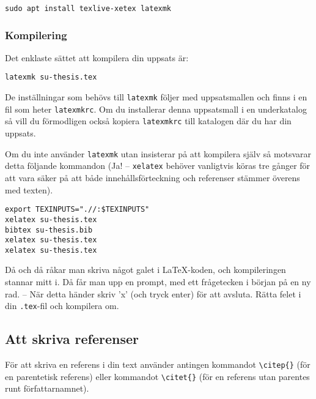\begin{verbatim}
sudo apt install texlive-xetex latexmk
\end{verbatim}



\subsubsection{Kompilering}

Det enklaste sättet att kompilera din uppsats är:

\begin{verbatim}
latexmk su-thesis.tex
\end{verbatim}

De inställningar som behövs till \texttt{latexmk} följer med uppsatsmallen och
finns i en fil som heter \texttt{latexmkrc}. Om du installerar denna
uppsatsmall i en underkatalog så vill du förmodligen också kopiera
\texttt{latexmkrc} till katalogen där du har din uppsats.

Om du inte använder \texttt{latexmk} utan insisterar på att kompilera
själv så motsvarar detta följande kommandon (Ja! -- \texttt{xelatex} behöver
vanligtvis köras tre gånger för att vara säker på att både innehållsförteckning
och referenser stämmer överens med texten).

\begin{verbatim}
export TEXINPUTS=".//:$TEXINPUTS"
xelatex su-thesis.tex
bibtex su-thesis.bib
xelatex su-thesis.tex
xelatex su-thesis.tex
\end{verbatim}

\noindent Då och då råkar man skriva något galet i \LaTeX-koden, och kompileringen
stannar mitt i. Då får man upp en prompt, med ett frågetecken i början på en ny
rad. -- När detta händer skriv 'x' (och tryck enter) för att avsluta. Rätta
felet i din \texttt{.tex}-fil och kompilera om.


\subsection{Att skriva referenser}

För att skriva en referens i din text använder antingen kommandot
\texttt{\textbackslash{}citep\{\}} (för en parentetisk referens) eller
kommandot \texttt{\textbackslash{}citet\{\}} (för en referens utan parentes
runt författarnamnet).

